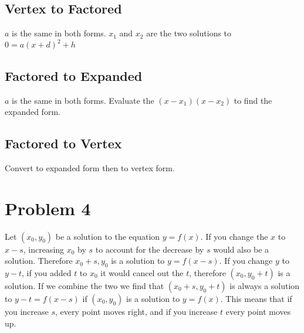 \documentclass[12pt, letterpaper, twoside]{article}
\begin{document}
\subsection{Vertex to Factored}
$a$ is the same in both forms. $x_1$ and $x_2$ are the two solutions to $0 = a(x+d)^2 + h$
\subsection{Factored to Expanded}
$a$ is the same in both forms. Evaluate the $(x-x_1)(x-x_2)$ to find the expanded form.
\subsection{Factored to Vertex}
Convert to expanded form then to vertex form.
\section{Problem 4}
Let $(x_0,y_0)$ be a solution to the equation $y = f(x)$. If you change the $x$ to $x-s$, increasing $x_0$ by $s$ to account for the decrease by $s$ would also be a solution. Therefore $x_0 + s, y_0$ is a solution to $y = f(x-s)$. If you change $y$ to $y-t$, if you added $t$ to $x_0$ it would cancel out the $t$, therefore $(x_0, y_0 + t)$ is a solution. If we combine the two we find that $(x_0 + s, y_0 + t)$ is always a solution to $y-t =  f(x-s)$ if $(x_0,y_0)$ is a solution to $y = f(x)$. This means that if you increase $s$, every point moves right, and if you increase $t$ every point moves up.
\end{document}
